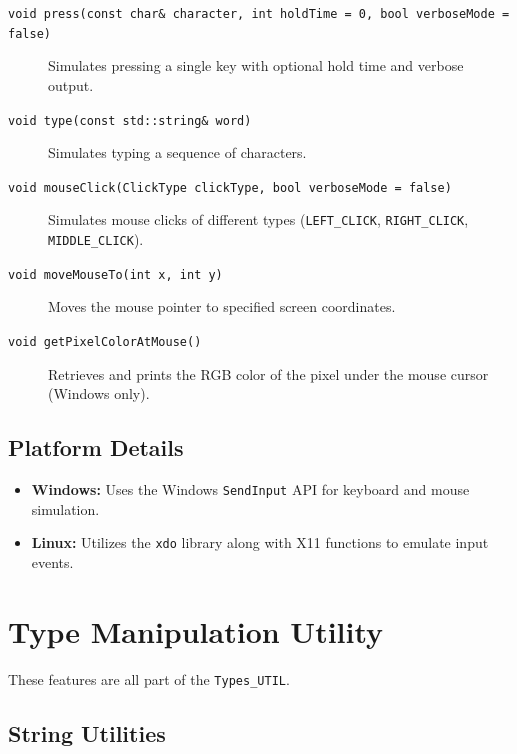 \begin{description}
	\item[\texttt{void press(const char\& character, int holdTime = 0, bool verboseMode = false)}]  
	Simulates pressing a single key with optional hold time and verbose output.
	
	\item[\texttt{void type(const std::string\& word)}]  
	Simulates typing a sequence of characters.
	
	\item[\texttt{void mouseClick(ClickType clickType, bool verboseMode = false)}]  
	Simulates mouse clicks of different types (\texttt{LEFT\_CLICK}, \texttt{RIGHT\_CLICK}, \texttt{MIDDLE\_CLICK}).
	
	\item[\texttt{void moveMouseTo(int x, int y)}]  
	Moves the mouse pointer to specified screen coordinates.
	
	\item[\texttt{void getPixelColorAtMouse()}]  
	Retrieves and prints the RGB color of the pixel under the mouse cursor (Windows only).
\end{description}

\subsection{Platform Details}

\begin{itemize}\itemsep0em
	\item \textbf{Windows:} Uses the Windows \texttt{SendInput} API for keyboard and mouse simulation.

	\item \textbf{Linux:} Utilizes the \texttt{xdo} library along with X11 functions to emulate input events.
\end{itemize}










\section{Type Manipulation Utility}
\label{sec:typeManipulationUtility}

These features are all part of the \texttt{Types\_UTIL}.


\subsection{String Utilities}

